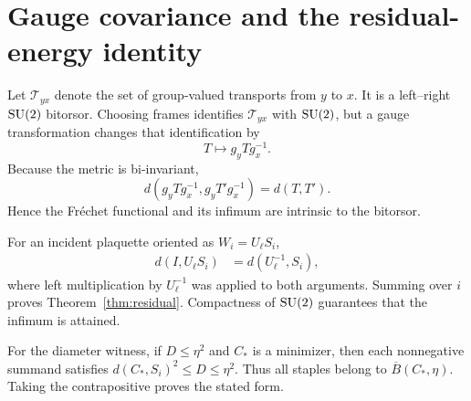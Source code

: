 \section{Gauge covariance and the residual-energy identity}
\label{app:gauge}

Let $\mathcal T_{yx}$ denote the set of group-valued transports from $y$ to
$x$.  It is a left--right $\mathrm{SU}(2)$ bitorsor.  Choosing frames identifies
$\mathcal T_{yx}$ with $\mathrm{SU}(2)$, but a gauge transformation changes that
identification by
\[
  T\longmapsto g_yTg_x^{-1}.
\]
Because the metric is bi-invariant,
\[
 d(g_yTg_x^{-1},g_yT'g_x^{-1})=d(T,T').
\]
Hence the Fr\'echet functional and its infimum are intrinsic to the bitorsor.

For an incident plaquette oriented as $W_i=U_\ell S_i$,
\begin{align*}
 d(I,U_\ell S_i)
 &=d(U_\ell^{-1},S_i),
\end{align*}
where left multiplication by $U_\ell^{-1}$ was applied to both arguments.
Summing over $i$ proves Theorem~\ref{thm:residual}.  Compactness of $\mathrm{SU}(2)$
guarantees that the infimum is attained.

For the diameter witness, if $D\le\eta^2$ and $C_*$ is a minimizer, then each
nonnegative summand satisfies $d(C_*,S_i)^2\le D\le\eta^2$.  Thus all staples
belong to $\overline B(C_*,\eta)$.  Taking the contrapositive proves the stated
form.
